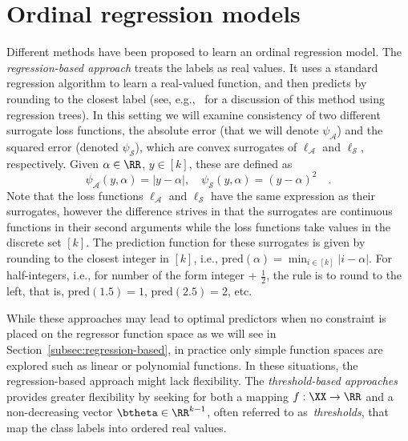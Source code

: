\section{Ordinal regression models}\label{sec:problem_setting}

Different methods have been proposed to learn an ordinal regression model. The \emph{\mbox{regression-based} approach} treats the labels as real values. It uses a standard regression algorithm to learn a real-valued function, and then predicts by rounding to the closest label (see, e.g.,~\citet{kramer2001prediction} for a discussion of this method using regression trees). In this setting we will examine consistency of two different surrogate loss functions, the absolute error (that we will denote $\psi_{\mathcal{A}}$) and the squared error (denoted $\psi_{\mathcal{S}}$), which are convex surrogates of $\ell_{\mathcal{A}}$ and $\ell_{\mathcal{S}}$, respectively. Given $\alpha \in \RR$, $y \in [k]$, these are defined as
\begin{equation}\label{eq:regression_based_surrogates}
\psi_{\mathcal{A}}(y, \alpha) = |y - \alpha|, \quad \psi_{\mathcal{S}}(y, \alpha) = (y - \alpha)^2 \quad.
\end{equation}
Note that the loss functions $\ell_{\mathcal{A}}$ and $\ell_{\mathcal{S}}$ have the same expression as their surrogates, however the difference strives in that the surrogates are continuous functions in their second arguments while the loss functions take values in the discrete set $[k]$. The prediction function for these surrogates is given by rounding to the closest integer in $[k]$, i.e., $\text{pred}(\alpha) = \min_{i \in [k]} |i - \alpha|$. For half-integers, i.e., for number of the form integer + $\frac{1}{2}$, the rule is to round to the left, that is, $\text{pred}(1.5) = 1$, $\text{pred}(2.5) = 2$, etc.



While these approaches may lead to optimal predictors when no constraint is placed on the regressor function space as we will see in Section~\ref{subsec:regression-based}, in practice only simple function spaces are explored such as linear or polynomial functions. In these situations, the regression-based approach might lack flexibility. The \emph{\mbox{threshold-based} approaches}~\citep{McCullagh1980,Rennie,Keerthi2003,lin2006large} provides greater flexibility by seeking for both a mapping $f: \XX \to \RR$ and a non-decreasing vector $\btheta \in \RR^{k-1}$, often referred to as~\emph{thresholds}, that map the class labels into ordered real values. 

